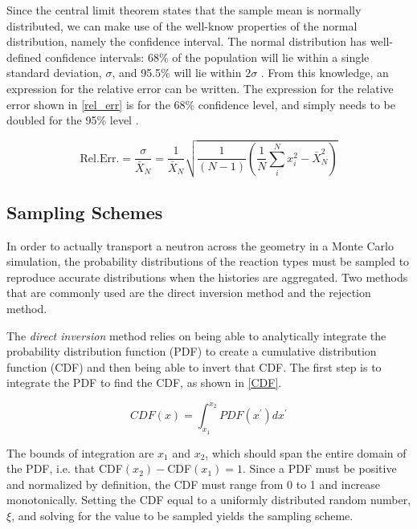Since the central limit theorem states that the sample mean is normally distributed, we can make use of the well-know properties of the normal distribution, namely the confidence interval.  The normal distribution has well-defined confidence intervals: 68\% of the population will lie within a single standard deviation, $\sigma$, and 95.5\% will lie within $2\sigma$ \cite{jaakko}.  From this knowledge, an expression for the relative error can be written.  The expression for the relative error shown in \eqref{rel_err} is for the 68\% confidence level, and simply needs to be doubled for the 95\% level \cite{mcnp}.

\begin{equation}
\label{rel_err}
\mathrm{Rel. Err.} = \frac{\sigma}{\bar{X}_N} = \frac{1}{\bar{X}_N}\sqrt{\frac{1}{(N-1)} \left( \frac{1}{N}\sum_i^N x_i^2-\bar{X}_N^2 \right)}
\end{equation}

\subsection{Sampling Schemes}

In order to actually transport a neutron across the geometry in a Monte Carlo simulation, the probability distributions of the reaction types must be sampled to reproduce accurate distributions when the histories are aggregated.  Two methods that are commonly used are the direct inversion method and the rejection method.  

The \emph{direct inversion} method relies on being able to analytically integrate the probability distribution function (PDF) to create a cumulative distribution function (CDF) and then being able to invert that CDF.  The first step is to integrate the PDF to find the CDF, as shown in \eqref{CDF}.

\begin{equation}
\label{CDF}
CDF(x) = \int_{x_1}^{x_2} PDF(x^\prime) dx^\prime
\end{equation}

The bounds of integration are $x_1$ and $x_2$, which should span the entire domain of the PDF, i.e. that CDF$(x_2) - $CDF$(x_1) = 1$. Since a PDF must be positive and normalized by definition, the CDF must range from 0 to 1 and increase monotonically.  Setting the CDF equal to a uniformly distributed random number, $\xi$, and solving for the value to be sampled yields the sampling scheme.  


